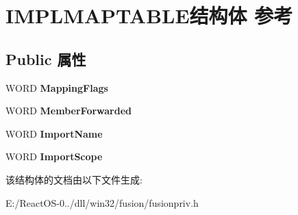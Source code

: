 \hypertarget{struct_i_m_p_l_m_a_p_t_a_b_l_e}{}\section{I\+M\+P\+L\+M\+A\+P\+T\+A\+B\+L\+E结构体 参考}
\label{struct_i_m_p_l_m_a_p_t_a_b_l_e}
\subsection*{Public 属性}
\begin{DoxyCompactItemize}
\item 
\mbox{\label{struct_i_m_p_l_m_a_p_t_a_b_l_e_ad4452c97dd6ecc59fae2f30e21ec2498}} 
W\+O\+RD {\bfseries Mapping\+Flags}
\item 
\mbox{\label{struct_i_m_p_l_m_a_p_t_a_b_l_e_a4714bd7691dd1e93ec44d49c8b510f1f}} 
W\+O\+RD {\bfseries Member\+Forwarded}
\item 
\mbox{\label{struct_i_m_p_l_m_a_p_t_a_b_l_e_ab0d963175fe3128d40f9e1d1579605e5}} 
W\+O\+RD {\bfseries Import\+Name}
\item 
\mbox{\label{struct_i_m_p_l_m_a_p_t_a_b_l_e_acbc08cdc23ca1f2218008b030020f465}} 
W\+O\+RD {\bfseries Import\+Scope}
\end{DoxyCompactItemize}


该结构体的文档由以下文件生成\+:\begin{DoxyCompactItemize}
\item 
E\+:/\+React\+O\+S-\/0../dll/win32/fusion/fusionpriv.\+h\end{DoxyCompactItemize}
